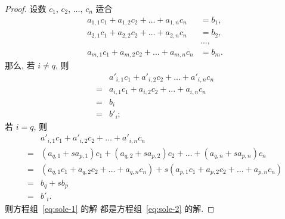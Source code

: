 \documentclass[../libro.tex]{subfiles}
\begin{document}
\begin{proof}
    设数 \(c_1\), \(c_2\), \(\dots\), \(c_n\) 适合
    \begin{align*}
        a_{1,1} c_1 + a_{1,2} c_2 + \dots + a_{1,n} c_n & = b_1, \\
        a_{2,1} c_1 + a_{2,2} c_2 + \dots + a_{2,n} c_n & = b_2, \\
        & \dots, \\
        a_{m,1} c_1 + a_{m,2} c_2 + \dots + a_{m,n} c_n & = b_m.
    \end{align*}
    那么, 若 \(i \neq q\), 则
    \begin{align*}
        &
        a'_{i,1} c_1 + a'_{i,2} c_2 + \dots + a'_{i,n} c_n
        \\
        = {} &
        a_{i,1} c_1 + a_{i,2} c_2 + \dots + a_{i,n} c_n
        \\
        = {} &
        b_i
        \\
        = {} &
        b'_i;
    \end{align*}
    若 \(i = q\), 则
    \begin{align*}
        &
        a'_{i,1} c_1 + a'_{i,2} c_2 + \dots + a'_{i,n} c_n
        \\
        = {} &
        (a_{q,1} + s a_{p,1}) c_1
        + (a_{q,2} + s a_{p,2}) c_2
        + \dots
        + (a_{q,n} + s a_{p,n}) c_n
        \\
        = {} &
        (a_{q,1} c_1 + a_{q,2} c_2 + \dots + a_{q,n} c_n)
        + s (a_{p,1} c_1 + a_{p,2} c_2 + \dots + a_{p,n} c_n)
        \\
        = {} &
        b_q + s b_p
        \\
        = {} &
        b'_i.
    \end{align*}
    则方程组~\eqref{eq:sole-1} 的解%
    都是方程组~\eqref{eq:sole-2} 的解.


\end{proof}
\end{document}

